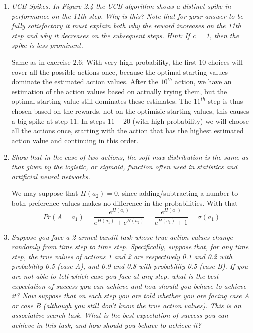 \documentclass[12pt,a4paper]{article}
\begin{document}
\begin{enumerate}
\item
  \textit{UCB Spikes. In Figure 2.4 the UCB algorithm shows a distinct spike
  in performance on the 11th step. Why is this? Note that for your answer to be fully
  satisfactory it must explain both why the reward increases on the 11th step and why it
  decreases on the subsequent steps. Hint: If c = 1, then the spike is less prominent.}

  Same as in exercise $2.6$: With very high probability, the first $10$ choices will cover all the possible actions
  once, because the optimal starting values dominate the estimated action values.
  After the $10^{th}$ action, we have an estimation of the action values based
  on actually trying them, but the optimal starting value still dominates these estimates.
  The $11^{th}$ step is thus chosen based on the rewards, not on the optimisic starting values,
  this causes a big spike at step $11$. In steps $11-20$ (with high probability) we will
  choose all the actions once, starting with the action that has the highest estimated
  action value and continuing in this order.

\item
  \textit{Show that in the case of two actions, the soft-max distribution is the same
  as that given by the logistic, or sigmoid, function often used in statistics and artificial
  neural networks.}

  We may suppose that $H(a_2) = 0$, since adding/subtracting a number to both preference
  values makes no difference in the probabilities. With that
  \[
  Pr(A = a_1) = \frac{e^{H(a_1)}}{e^{H(a_1)} + e^{H(a_2)}} = \frac{e^{H(a_1)}}{e^{H(a_1)} + 1} = \sigma(a_1)
  \]

\item
  \textit{Suppose you face a 2-armed bandit task whose true action values change
  randomly from time step to time step. Specifically, suppose that, for any time step, the
  true values of actions 1 and 2 are respectively 0.1 and 0.2 with probability 0.5 (case A),
  and 0.9 and 0.8 with probability 0.5 (case B). If you are not able to tell which case you
  face at any step, what is the best expectation of success you can achieve and how should
  you behave to achieve it? Now suppose that on each step you are told whether you are
  facing case A or case B (although you still don’t know the true action values). This is an
  associative search task. What is the best expectation of success you can achieve in this
  task, and how should you behave to achieve it?}


\end{enumerate}
\end{document}
